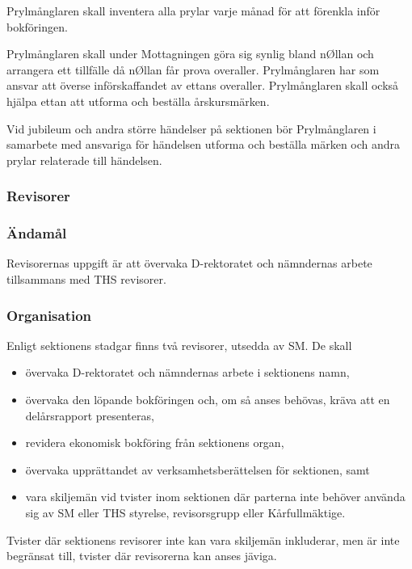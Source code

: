 \documentclass[a4paper,12pt]{article}
\begin{document}
Prylmånglaren skall inventera alla prylar varje månad för att förenkla inför bokföringen.

Prylmånglaren skall under Mottagningen göra sig synlig bland nØllan och arrangera ett tillfälle då nØllan får prova overaller. Prylmånglaren har som ansvar att överse införskaffandet av ettans overaller. Prylmånglaren skall också hjälpa ettan att utforma och beställa årskursmärken.

Vid jubileum och andra större händelser på sektionen bör Prylmånglaren i samarbete med ansvariga för händelsen utforma och beställa märken och andra prylar relaterade till händelsen.

\subsubsection{Revisorer}

\subsubsection{Ändamål}

Revisorernas uppgift är att övervaka D-rektoratet och nämndernas arbete tillsammans med THS revisorer.

\subsubsection{Organisation}

Enligt sektionens stadgar finns två revisorer, utsedda av SM. De skall

\begin{itemize}
  \item övervaka D-rektoratet och nämndernas arbete i sektionens namn,
  \item övervaka den löpande bokföringen och, om så anses behövas, kräva att en delårsrapport presenteras,
  \item revidera ekonomisk bokföring från sektionens organ,
  \item övervaka upprättandet av verksamhetsberättelsen för sektionen, samt
  \item vara skiljemän vid tvister inom sektionen där parterna inte behöver använda sig av SM eller THS styrelse, revisorsgrupp eller Kårfullmäktige.
\end{itemize}

Tvister där sektionens revisorer inte kan vara skiljemän inkluderar, men är inte begränsat till, tvister där revisorerna kan anses jäviga.
\end{document}
